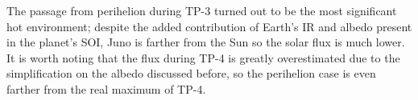 The passage from perihelion during TP-3 turned out to be the most significant hot environment; despite the added contribution of Earth’s IR and albedo present in the planet’s SOI, Juno is farther from the Sun so the solar flux is much lower.
It is worth noting that the flux during TP-4 is greatly overestimated due to the simplification on the albedo discussed before, so the perihelion case is even farther from the real maximum of TP-4.


